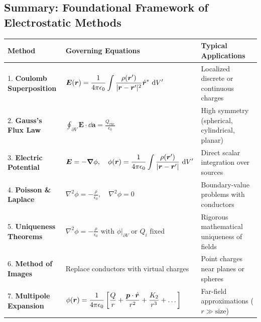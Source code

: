 \subsection{Summary: Foundational Framework of Electrostatic Methods}

\begin{center}
\renewcommand{\arraystretch}{1.4}
\begin{tabular}{|p{4.2cm}|p{6.0cm}|p{4.8cm}|}
\hline
\textbf{Method} & \textbf{Governing Equations} & \textbf{Typical Applications} \\ \hline
1. \textbf{Coulomb Superposition} & \(\displaystyle \bm{E}(\bm{r}) = \frac{1}{4\pi\epsilon_0}\int \frac{\rho(\bm{r}')}{|\bm{r} - \bm{r}'|^2}\hat{\bm{r}}^*\,\dd{V'}\) & Localized discrete or continuous charges \\ \hline
2. \textbf{Gauss's Flux Law} & \(\displaystyle \oint_{\partial V} \bm{E} \cdot \dd{\bm{a}} = \frac{Q_{\text{enc}}}{\epsilon_0}\) & High symmetry (spherical, cylindrical, planar) \\ \hline
3. \textbf{Electric Potential} & \(\displaystyle \bm{E} = -\grad\phi, \quad \phi(\bm{r}) = \frac{1}{4\pi\epsilon_0}\int \frac{\rho(\bm{r}')}{|\bm{r} - \bm{r}'|}\,\dd{V'}\) & Direct scalar integration over sources \\ \hline
4. \textbf{Poisson \& Laplace} & \(\displaystyle \nabla^2\phi = -\frac{\rho}{\epsilon_0}, \quad \nabla^2\phi = 0\) & Boundary-value problems with conductors \\ \hline
5. \textbf{Uniqueness Theorems} & \(\displaystyle \nabla^2\phi = -\frac{\rho}{\epsilon_0} \text{ with } \phi|_{\partial V} \text{ or } Q_i \text{ fixed}\) & Rigorous mathematical uniqueness of fields \\ \hline
6. \textbf{Method of Images} & Replace conductors with virtual charges & Point charges near planes or spheres \\ \hline
7. \textbf{Multipole Expansion} & \(\displaystyle \phi(\bm{r}) = \frac{1}{4\pi\epsilon_0}\left[\frac{Q}{r} + \frac{\bm{p}\cdot\hat{\bm{r}}}{r^2} + \frac{K_2}{r^3} + \dots\right]\) & Far-field approximations (\(r \gg \text{size}\)) \\ \hline
\end{tabular}
\end{center}